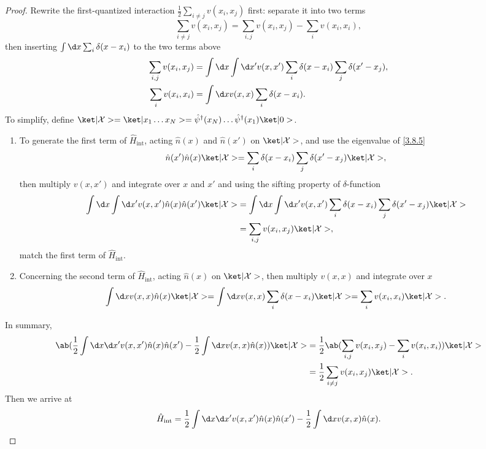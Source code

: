 \begin{solution}
\begin{proof}
  Rewrite the first-quantized interaction
  $\frac12 \sum_{i\neq j} v(x_i,x_j)$ first: separate it into two terms
  \[
    \sum_{i\neq j} v(x_i,x_j) = \sum_{i,j} v(x_i,x_j) - \sum_{i} v(x_i,x_i),
  \]
  then inserting $\int \d x \sum_i \delta(x - x_i)$ to the two terms above
  \begin{align*}
    \sum_{i,j} v(x_i,x_j) &
  = \int \d x \int \d x' v(x,x')
    \sum_i \delta(x - x_i) \sum_j \delta(x' - x_j),\\
    \sum_{i} v(x_i,x_i)   & = \int \d x v(x,x) \sum_i \delta(x - x_i).
  \end{align*}
  To simplify, define $\ket|\mathcal X> = \ket|x_1 \ldots x_N>
  = \hat\psi^\dagger(x_N) \ldots \hat\psi^\dagger(x_1) \ket|0>$.
  \begin{enumerate}
    \item To generate the first term of $\hat H_\text{int}$,
    acting $\hat n(x)$ and $\hat n(x')$ on $\ket|\mathcal X>$,
    and use the eigenvalue of \eqref{3.8.5}
    \[
      \hat n(x') \hat n(x) \ket|\mathcal X>
    = \sum_i \delta(x - x_i) \sum_j \delta(x' - x_j)
      \ket|\mathcal X>,
    \]
    then multiply $v(x,x')$ and integrate over $x$ and $x'$
    and using the sifting property of $\delta$-function
    \[
      \begin{aligned}
        \int \d x \int \d x' v(x,x') \hat n(x) \hat n(x') \ket|\mathcal X>
    & = \int \d x \int \d x' v(x,x') \sum_i \delta(x - x_i)
        \sum_j \delta(x' - x_j) \ket|\mathcal X>\\
    & = \sum_{i,j} v(x_i,x_j) \ket|\mathcal X>,
      \end{aligned}
    \]
    match the first term of $\hat H_\text{int}$.
    \item Concerning the second term of $\hat H_\text{int}$,
    acting $\hat n(x)$ on $\ket|\mathcal X>$,
    then multiply $v(x,x)$ and integrate over $x$
    \[
      \int \d x v(x,x) \hat n(x) \ket|\mathcal X>
    = \int \d x v(x,x) \sum_i \delta(x - x_i) \ket|\mathcal X> = \sum_i v(x_i,x_i) \ket|\mathcal X>.
    \]
  \end{enumerate}
  In summary,
  \begin{align*}
    \ab(\frac12 \int \d x \d x' v(x,x') \hat n(x) \hat n(x')
  - \frac12 \int \d x v(x,x) \hat n(x)) \ket|\mathcal X>
& = \frac12 \ab(\sum_{i,j} v(x_i,x_j) - \sum_i v(x_i,x_i)) \ket|\mathcal X>\\
& = \frac12 \sum_{i\neq j} v(x_i,x_j) \ket|\mathcal X>.
  \end{align*}
  Then we arrive at
  \[
    \hat H_\text{int} =
    \frac12 \int \d x \d x' v(x,x') \hat n(x) \hat n(x')
  - \frac12 \int \d x v(x,x) \hat n(x).
  \]
\end{proof}
\end{solution}

